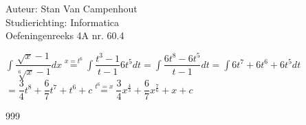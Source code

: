 \documentclass[a4paper]{article}
\begin{document}
  
\noindent \large Auteur: Stan Van Campenhout \\
\noindent \large Studierichting:  Informatica\\
\noindent \large Oefeningenreeks 4A nr. 60.4\\

\medskip

\normalsize

$ \displaystyle\int\dfrac{\sqrt{x}-1}{\sqrt[6]{x}-1}dx \stackrel{x = t^6}{=} \displaystyle\int\dfrac{t^3-1}{t-1}6t^5dt =  \displaystyle\int\dfrac{6t^8-6t^5}{t-1}dt
= \displaystyle\int6t^7+6t^6+6t^5dt $\\

$ = \dfrac{3}{4}t^8+\dfrac{6}{7}t^7+t^6 + c \stackrel{t^6 = x}{=} \dfrac{3}{4}x^{\tfrac{4}{3}}+\dfrac{6}{7}x^{\tfrac{7}{6}} + x + c $\\

\begin{thebibliography}{999}
\end{thebibliography}
\end{document}

